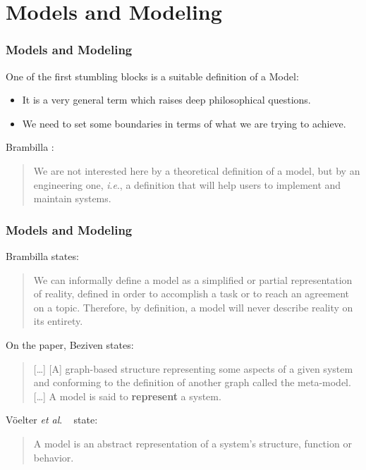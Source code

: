 \documentclass{beamer}
\newcommand{\etal}{\textit{et al}. }
\newcommand{\ie}{\textit{i}.\textit{e}., }
\begin{document}
\section{Models and Modeling}

\begin{frame}
\frametitle{Models and Modeling}

One of the first stumbling blocks is a suitable definition of a
Model:
\pause

\begin{itemize}
\item It is a very general term which raises deep philosophical
  questions.
  \pause
\item We need to set some boundaries in terms of what we are trying to
  achieve.
  \pause
\end{itemize}

Brambilla \cite{brambilla2012model}:

\begin{quote}
We are not interested here by a theoretical definition of a model, but
by an engineering one, \ie a definition that will help users to
implement and maintain systems.
\end{quote}

\end{frame}

\begin{frame}
\frametitle{Models and Modeling}

Brambilla\cite{brambilla2012model} states:

\begin{quote}
We can informally define a model as a simplified or partial
representation of reality, defined in order to accomplish a task or to
reach an agreement on a topic. Therefore, by definition, a model will
never describe reality on its entirety.
\end{quote}

\pause

On the paper, Beziven states:

\begin{quote}
[\ldots] [A] graph-based structure representing some aspects of a
given system and conforming to the definition of another graph called
the meta-model. [\ldots] A model is said to \textbf{represent} a
system.
\end{quote}

\pause

V{\"o}elter \etal~\cite{volter2013model} state:

\begin{quote}
A model is an abstract representation of a system’s structure,
function or behavior.
\end{quote}

\end{frame}
\end{document}
